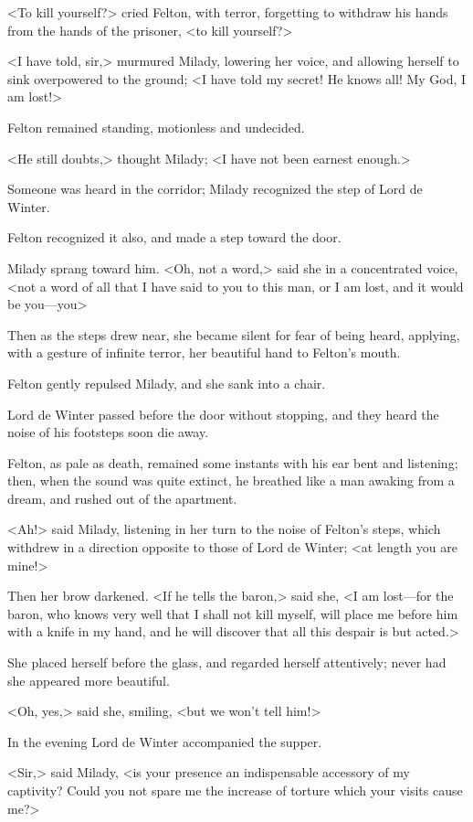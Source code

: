<To kill yourself?> cried Felton, with terror, forgetting to withdraw his hands from the hands of the prisoner, <to kill yourself?> 

<I have told, sir,> murmured Milady, lowering her voice, and allowing herself to sink overpowered to the ground; <I have told my secret! He knows all! My God, I am lost!> 

Felton remained standing, motionless and undecided. 

<He still doubts,> thought Milady; <I have not been earnest enough.> 

Someone was heard in the corridor; Milady recognized the step of Lord de Winter. 

Felton recognized it also, and made a step toward the door. 

Milady sprang toward him. <Oh, not a word,> said she in a concentrated voice, <not a word of all that I have said to you to this man, or I am lost, and it would be you—you\longdash> 

Then as the steps drew near, she became silent for fear of being heard, applying, with a gesture of infinite terror, her beautiful hand to Felton's mouth. 

Felton gently repulsed Milady, and she sank into a chair. 

Lord de Winter passed before the door without stopping, and they heard the noise of his footsteps soon die away. 

Felton, as pale as death, remained some instants with his ear bent and listening; then, when the sound was quite extinct, he breathed like a man awaking from a dream, and rushed out of the apartment. 

<Ah!> said Milady, listening in her turn to the noise of Felton's steps, which withdrew in a direction opposite to those of Lord de Winter; <at length you are mine!> 

Then her brow darkened. <If he tells the baron,> said she, <I am lost—for the baron, who knows very well that I shall not kill myself, will place me before him with a knife in my hand, and he will discover that all this despair is but acted.> 

She placed herself before the glass, and regarded herself attentively; never had she appeared more beautiful. 

<Oh, yes,> said she, smiling, <but we won't tell him!> 

In the evening Lord de Winter accompanied the supper. 

<Sir,> said Milady, <is your presence an indispensable accessory of my captivity? Could you not spare me the increase of torture which your visits cause me?> 


